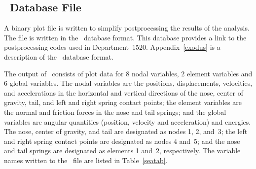 \subsection{\EXO\ Database File}

A binary plot file is written to simplify postprocessing the results of
the analysis.  The file is written in the \EXO\ database format.  This
database provides a link to the postprocessing codes used in
Department~1520.  Appendix~\ref{exodus} is a description of the \EXO\ database
format.

The output of \SLAP\  consists of plot data for 8 nodal variables, 2 element
variables and 6 global variables.  The nodal variables are the positions,
displacements,  velocities, and accelerations in the horizontal and vertical
directions  of the nose, center of gravity, tail, and left and right spring
contact points;  the element variables are the normal and friction forces in
the nose and tail springs; and the global variables are angular quantities
(position, velocity and acceleration) and energies.  The nose, center of
gravity, and tail are designated as nodes 1, 2, and~3; the left and right
spring contact points are designated as nodes 4 and~5; and the nose and tail
springs are designated as elements 1 and~2, respectively. The variable names
written to the \EXO\ file are listed in Table~\ref{seatab}.

